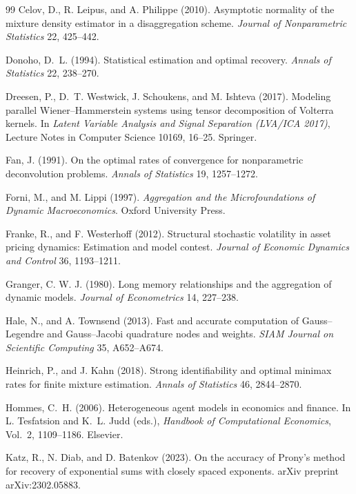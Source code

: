 \documentclass[12pt]{article}
\theoremstyle{definition}
\theoremstyle{remark}
\begin{document}
\begin{thebibliography}{99}
 Celov, D., R. Leipus, and A. Philippe (2010). Asymptotic normality of the mixture density estimator in a disaggregation scheme. \emph{Journal of Nonparametric Statistics} 22, 425--442.

 Donoho, D.~L. (1994). Statistical estimation and optimal recovery. \emph{Annals of Statistics} 22, 238--270.

 Dreesen, P., D.~T. Westwick, J. Schoukens, and M. Ishteva (2017). Modeling parallel Wiener--Hammerstein systems using tensor decomposition of Volterra kernels. In \emph{Latent Variable Analysis and Signal Separation (LVA/ICA 2017)}, Lecture Notes in Computer Science 10169, 16--25. Springer.

 Fan, J. (1991). On the optimal rates of convergence for nonparametric deconvolution problems. \emph{Annals of Statistics} 19, 1257--1272.

 Forni, M., and M. Lippi (1997). \emph{Aggregation and the Microfoundations of Dynamic Macroeconomics}. Oxford University Press.

 Franke, R., and F. Westerhoff (2012). Structural stochastic volatility in asset pricing dynamics: Estimation and model contest. \emph{Journal of Economic Dynamics and Control} 36, 1193--1211.

 Granger, C. W. J. (1980). Long memory relationships and the aggregation of dynamic models. \emph{Journal of Econometrics} 14, 227--238.

 Hale, N., and A. Townsend (2013). Fast and accurate computation of Gauss--Legendre and Gauss--Jacobi quadrature nodes and weights. \emph{SIAM Journal on Scientific Computing} 35, A652--A674.

 Heinrich, P., and J. Kahn (2018). Strong identifiability and optimal minimax rates for finite mixture estimation. \emph{Annals of Statistics} 46, 2844--2870.

 Hommes, C.~H. (2006). Heterogeneous agent models in economics and finance. In L. Tesfatsion and K.~L. Judd (eds.), \emph{Handbook of Computational Economics}, Vol.~2, 1109--1186. Elsevier.

 Katz, R., N. Diab, and D. Batenkov (2023). On the accuracy of Prony's method for recovery of exponential sums with closely spaced exponents. arXiv preprint arXiv:2302.05883.


\end{thebibliography}
\end{document}
